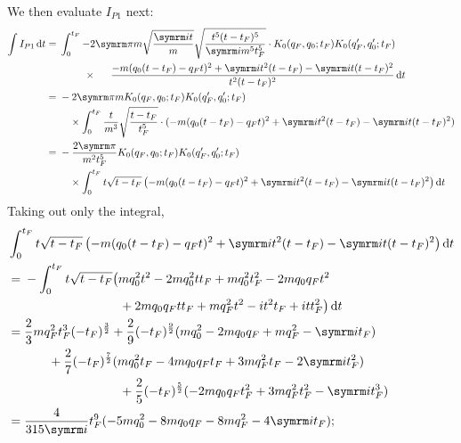 We then evaluate $I_{P1}$ next:
\begin{align}
    \int I_{P1}\dd{t} &= \begin{multlined}[t]
        \shoveleft{\int_0^{t_F} -2\cpi m \sqrt{\frac{\im t}{m}}\sqrt{\frac{t^5(t - t_F)^5}{\im m^5 t_F^5}}\cdot K_0(q_F, q_0; t_F)K_0(q_F', q_0'; t_F)} \\
        \shoveright{\times\frac{-m(q_0(t - t_F) - q_Ft)^2 + \im t^2(t - t_F) - \im t(t - t_F)^2}{t^2(t - t_F)^2}\dd{t}}
    \end{multlined} \\
    &= \begin{multlined}[t]
        -2\cpi m K_0(q_F, q_0; t_F)K_0(q_F', q_0'; t_F) \\
        \times \int_0^{t_F} \frac{t}{m^3}\sqrt{\frac{t - t_F}{t_F^5}}\cdot(-m(q_0(t - t_F) - q_Ft)^2 + \im t^2(t - t_F) - \im t(t - t_F)^2)
    \end{multlined} \\
    &= \begin{multlined}[t]
        -\frac{2\cpi}{m^2t_F^5} K_0(q_F, q_0; t_F)K_0(q_F', q_0'; t_F) \\
        \times \int_0^{t_F} t\sqrt{t - t_F}\left(-m(q_0(t - t_F) - q_Ft)^2 + \im t^2(t - t_F) - \im t(t - t_F)^2\right) \dd{t}
    \end{multlined} \\
\end{align}
Taking out only the integral,
\begin{align}
    &\int_0^{t_F} t\sqrt{t - t_F}\left(-m(q_0(t - t_F) - q_Ft)^2 + \im t^2(t - t_F) - \im t(t - t_F)^2\right) \dd{t} \\
    &= \begin{multlined}[t]
        -\int_0^{t_F} t \sqrt{t - t_{F}} \big(m q_{0}^{2} t^{2} - 2 m q_{0}^{2} t t_{F} + m q_{0}^{2} t_{F}^{2} - 2 m q_{0} q_{F} t^{2} \\+ 2 m q_{0} q_{F} t t_{F} + m q_{F}^{2} t^{2} - i t^{2} t_{F} + i t t_{F}^{2}\big) \dd{t}
    \end{multlined} \\
    &= \begin{multlined}[t]
        \frac{2}{3} mq_F^2t_F^3(-t_F)^{\frac{3}{2}} + \frac{2}{9}(-t_F)^{\frac{9}{2}}(mq_0^2 - 2mq_0q_F + mq_F^2 - \im t_F) \\
        + \frac{2}{7}(-t_F)^{\frac{7}{2}}(mq_0^2t_F - 4mq_0q_Ft_F + 3mq_F^2t_F - 2\im t_F^2) \\+ \frac{2}{5}(-t_F)^{\frac{5}{2}}(-2mq_0q_Ft_F^2 + 3mq_F^2t_F^2 - \im t_F^3)
    \end{multlined} \\
    &= \frac{4}{315\im}t_F^9(-5mq_0^2 - 8mq_0q_F - 8mq_F^2 - 4\im t_F);
\end{align}
